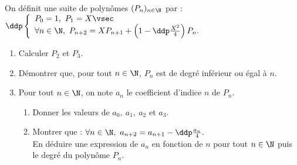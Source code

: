 \documentclass[a4paper, 11pt,reqno]{article}
\begin{document}
\begin{exercice}  \;
	\noindent On d\'efinit une suite de polyn\^omes $(P_n)_{n\in\N}$ par :$\ddp \left\lbrace\begin{array}{l} P_0=1,\ P_1=X\vsec \\
			\forall n\in\N,\ P_{n+2}=XP_{n+1}+\left( 1-\ddp\frac{X^2}{4}\right)P_n.
		\end{array}\right.$
	\begin{enumerate}
		\item Calculer $P_2$ et $P_3$.
		\item D\'emontrer que, pour tout $n\in\N$, $P_n$ est de degr\'e inf\'erieur ou \'egal \`a $n$.
		\item Pour tout $n\in\N$, on note $a_n$ le coefficient d'indice $n$ de $P_n$.
		      \begin{enumerate}
			      \item Donner les valeurs de $a_0,\ a_1,\ a_2$ et $a_3$.
			      \item Montrer que : $\forall n\in\N,\ a_{n+2}=a_{n+1}-\ddp\frac{a_n}{4}.$\\
			            En d\'eduire une expression de $a_n$ en fonction de $n$ pour tout $n\in\N$ puis le degr\'e du polyn\^ome $P_n$.
		      \end{enumerate}
	\end{enumerate}
\end{exercice}
\end{document}
